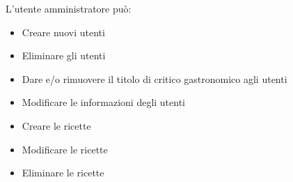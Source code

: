 \documentclass[a4paper]{article}
\begin{document}
\vspace{3mm}

L'utente amministratore può:
\begin{itemize}
    \item Creare nuovi utenti
    \item Eliminare gli utenti
    \item Dare e/o rimuovere il titolo di critico gastronomico agli utenti
    \item Modificare le informazioni degli utenti
    \item Creare le ricette
    \item Modificare le ricette
    \item Eliminare le ricette
\end{itemize}
\end{document}
